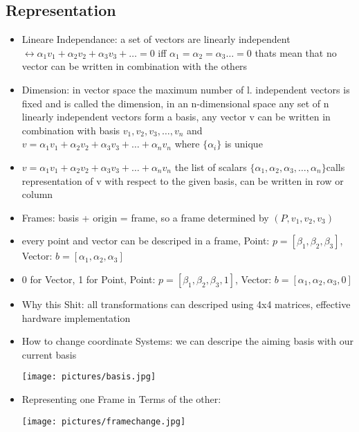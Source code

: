 \documentclass[11pt,a4paper]{article}
\begin{document}
	\subsection{Representation}
	\begin{itemize}
		\item Lineare Independance: a set of vectors are linearly independent $\leftrightarrow \alpha_{1}v_{1}+\alpha_{2}v_{2}+\alpha_{3}v_{3} +\dots = 0$ iff $\alpha_{1}=\alpha_{2}=\alpha_{3}\dots = 0$ thats mean that no vector can be written in combination with the others
		\item Dimension: in vector space the maximum number of l. independent vectors is fixed and is called the dimension, in an n-dimensional space any set of n linearly independent vectors form a basis, any vector v can be written in combination with basis $v_{1},v_{2},v_{3},\dots,v_{n}$ and $v= \alpha_{1}v_{1}+\alpha_{2}v_{2}+\alpha_{3}v_{3} +\dots+\alpha_{n}v_{n}$ where $\{\alpha_{i}\}$ is unique
		\item  $v= \alpha_{1}v_{1}+\alpha_{2}v_{2}+\alpha_{3}v_{3} +\dots+\alpha_{n}v_{n}$ the list of scalars $\{\alpha_{1},\alpha_{2},\alpha_{3},\dots,\alpha_{n}\} $calls representation of v with respect to the given basis, can be written in row or column
		\item Frames: basis + origin = frame, so a frame determined by $(P,v_{1},v_{2},v_{3})$
		\item every point and vector can be descriped in a frame, Point: $p=[\beta_{1},\beta_{2},\beta_{3}]$, Vector: $b=[\alpha_{1},\alpha_{2},\alpha_{3}]$
		\item 0 for Vector, 1 for Point, Point: $p=[\beta_{1},\beta_{2},\beta_{3},1]$, Vector: $b=[\alpha_{1},\alpha_{2},\alpha_{3},0]$
		\item Why this Shit: all transformations can descriped using 4x4 matrices, effective hardware implementation
		\item How to change coordinate Systems: we can descripe the aiming basis with our current basis 
		\begin{center}
			\texttt{[image: pictures/basis.jpg]}
		\end{center}
		\item Representing one Frame in Terms of the other:
		\begin{center}
			\texttt{[image: pictures/framechange.jpg]}
		\end{center}		
	\end{itemize}
\end{document}
